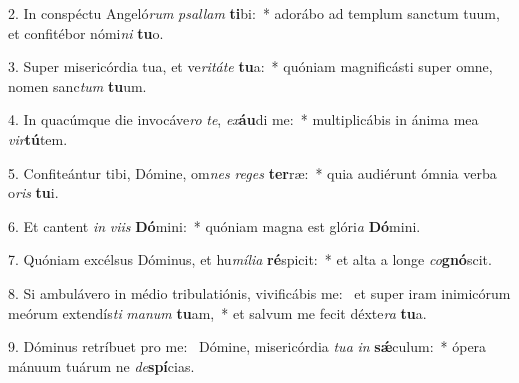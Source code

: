 2. In conspéctu Angeló\textit{rum} \textit{psal}\textit{lam} \textbf{ti}bi:~*  adorábo ad templum sanctum tuum, et confitébor nómi\textit{ni} \textbf{tu}o.\

3. Super misericórdia tua, et ve\textit{ri}\textit{tá}\textit{te} \textbf{tu}a:~*  quóniam magnificásti super omne, nomen sanc\textit{tum} \textbf{tu}um.\

4. In quacúmque die invocáve\textit{ro} \textit{te}, \textit{ex}\textbf{áu}di me:~*  multiplicábis in ánima mea \textit{vir}\textbf{tú}tem.\

5. Confiteántur tibi, Dómine, om\textit{nes} \textit{re}\textit{ges} \textbf{ter}ræ:~*  quia audiérunt ómnia verba o\textit{ris} \textbf{tu}i.\

6. Et cantent \textit{in} \textit{vi}\textit{is} \textbf{Dó}mini:~*  quóniam magna est glóri\textit{a} \textbf{Dó}mini.\

7. Quóniam excélsus Dóminus, et hu\textit{mí}\textit{li}\textit{a} \textbf{ré}spicit:~*  et alta a longe \textit{co}\textbf{gnó}scit.\

8. Si ambulávero in médio tribulatiónis, vivificábis me: \dag\  et super iram inimicórum meórum extendís\textit{ti} \textit{ma}\textit{num} \textbf{tu}am,~*  et salvum me fecit déxte\textit{ra} \textbf{tu}a.\

9. Dóminus retríbuet pro me: \dag\  Dómine, misericórdia \textit{tu}\textit{a} \textit{in} \textbf{sǽ}culum:~*  ópera mánuum tuárum ne \textit{de}\textbf{spí}cias.\

